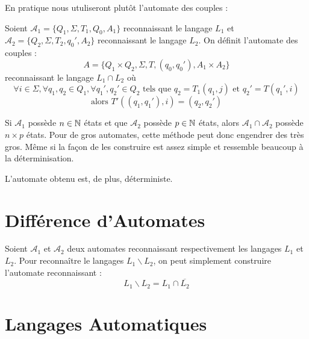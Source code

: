 En pratique nous utuliseront plutôt l'automate des couples : 

\begin{definition}
    Soient $ \mathcal{A}_1 = \{Q_1, \Sigma, T_1, Q_0, A_1\}$ reconnaissant le langage $L_1$ et 
    $ \mathcal{A}_2 = \{Q_2, \Sigma, T_2, q_0', A_2\}$ reconnaissant le langage $L_2$. On définit 
    l'automate des couples : 
        \[ A = \{Q_1 \times Q_2, \Sigma, T, (q_0,q_0'), A_1 \times A_2\} \] 
    reconnaissant le langage $L_1 \cap L_2$ où 
        \[ \forall i \in \Sigma, \forall q_1, q_2 \in Q_1, \forall q_1', q_2' \in Q_2 \text{ tels que } q_2 = T_1(q_1,j) \text{ et } q_2' = T(q_1',i) \]
        \[ \text{alors } T'((q_1, q_1'), i) = (q_2, q_2') \] 
\end{definition}

\begin{proposition}
    Si $ \mathcal{A}_1$ possède $n \in \mathbb{N}$ états et que $ \mathcal{A}_2$ possède $p \in \mathbb{N}$ états, alors 
    $ \mathcal{A}_1 \cap \mathcal{A}_2$ possède $n \times p$ états. 
    Pour de gros automates, cette méthode peut donc engendrer des très gros. 
    Même si la façon de les construire est assez simple et ressemble beaucoup à la déterminisation. 

    L'automate obtenu est, de plus, déterministe. 
\end{proposition}



\section{Différence d'Automates}

\begin{proposition}
    Soient $ \mathcal{A}_1$ et  $ \mathcal{A}_2$ deux automates reconnaissant respectivement les langages $L_1$ et $L_2$. 
    Pour reconnaître le langages $L_1 \backslash L_2$, on peut simplement construire l'automate reconnaissant :
        \[ L_1 \backslash L_2 = L_1 \cap \overline{L_2} \] 
\end{proposition}


\newpage

\section{Langages Automatiques}

